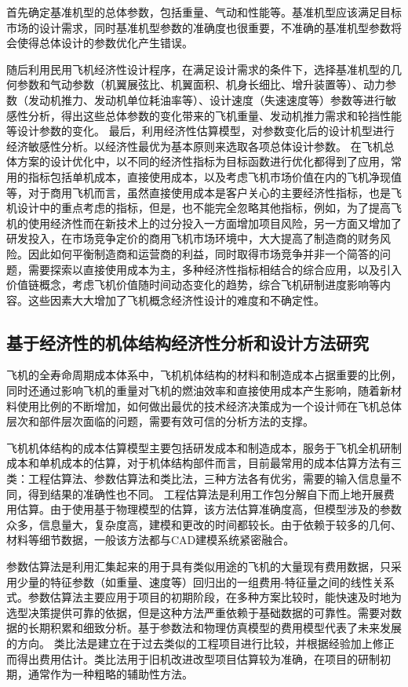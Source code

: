 首先确定基准机型的总体参数，包括重量、气动和性能等。基准机型应该满足目标市场的设计需求，同时基准机型参数的准确度也很重要，不准确的基准机型参数将会使得总体设计的参数优化产生错误。

随后利用民用飞机经济性设计程序，在满足设计需求的条件下，选择基准机型的几何参数和气动参数（机翼展弦比、机翼面积、机身长细比、增升装置等）、动力参数（发动机推力、发动机单位耗油率等）、设计速度（失速速度等）参数等进行敏感性分析，得出这些总体参数的变化带来的飞机重量、发动机推力需求和轮挡性能等设计参数的变化。
最后，利用经济性估算模型，对参数变化后的设计机型进行经济敏感性分析。以经济性最优为基本原则来选取各项总体设计参数。
在飞机总体方案的设计优化中，以不同的经济性指标为目标函数进行优化都得到了应用，常用的指标包括单机成本，直接使用成本，以及考虑飞机市场价值在内的飞机净现值等，对于商用飞机而言，虽然直接使用成本是客户关心的主要经济性指标，也是飞机设计中的重点考虑的指标，但是，也不能完全忽略其他指标，例如，为了提高飞机的使用经济性而在新技术上的过分投入一方面增加项目风险，另一方面又增加了研发投入，在市场竞争定价的商用飞机市场环境中，大大提高了制造商的财务风险。因此如何平衡制造商和运营商的利益，同时取得市场竞争并非一个简答的问题，需要探索以直接使用成本为主，多种经济性指标相结合的综合应用，以及引入价值链概念，考虑飞机价值随时间动态变化的趋势，综合飞机研制进度影响等内容。这些因素大大增加了飞机概念经济性设计的难度和不确定性。

\subsection{基于经济性的机体结构经济性分析和设计方法研究}
飞机的全寿命周期成本体系中，飞机机体结构的材料和制造成本占据重要的比例，同时还通过影响飞机的重量对飞机的燃油效率和直接使用成本产生影响，随着新材料使用比例的不断增加，如何做出最优的技术经济决策成为一个设计师在飞机总体层次和部件层次面临的问题，需要有效可信的分析方法的支撑。

飞机机体结构的成本估算模型主要包括研发成本和制造成本，服务于飞机全机研制成本和单机成本的估算，对于机体结构部件而言，目前最常用的成本估算方法有三类：工程估算法、参数估算法和类比法，三种方法各有优劣，需要的输入信息量不同，得到结果的准确性也不同。
工程估算法是利用工作包分解自下而上地开展费用估算。由于使用基于物理模型的估算，该方法估算准确度高，但模型涉及的参数众多，信息量大，复杂度高，建模和更改的时间都较长。由于依赖于较多的几何、材料等细节数据，一般该方法都与CAD建模系统紧密融合。

参数估算法是利用汇集起来的用于具有类似用途的飞机的大量现有费用数据，只采用少量的特征参数（如重量、速度等）回归出的一组费用-特征量之间的线性关系式。参数估算法主要应用于项目的初期阶段，在多种方案比较时，能快速及时地为选型决策提供可靠的依据，但是这种方法严重依赖于基础数据的可靠性。需要对数据的长期积累和细致分析。基于参数法和物理仿真模型的费用模型代表了未来发展的方向。
类比法是建立在于过去类似的工程项目进行比较，并根据经验加上修正而得出费用估计。类比法用于旧机改进改型项目估算较为准确，在项目的研制初期，通常作为一种粗略的辅助性方法。

